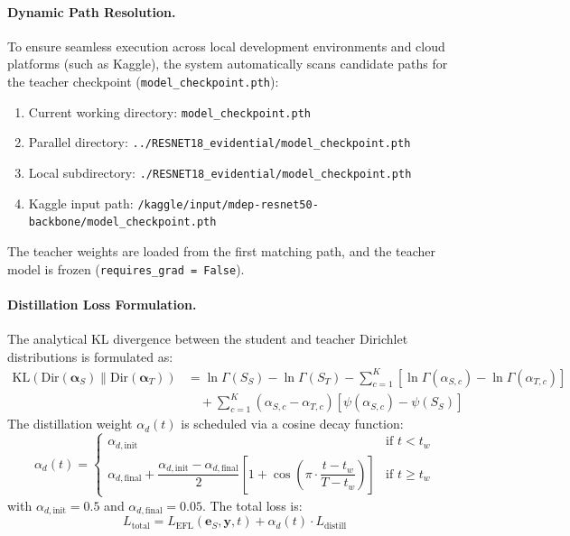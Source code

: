 \documentclass[letterpaper]{article} %
\newcommand{\Dir}{\text{Dir}}
\newcommand{\KL}{\text{KL}}
\begin{document}
\paragraph{Dynamic Path Resolution.}
To ensure seamless execution across local development environments and cloud platforms (such as Kaggle), the system automatically scans candidate paths for the teacher checkpoint (\texttt{model\_checkpoint.pth}):
\begin{enumerate}
    \item Current working directory: \texttt{model\_checkpoint.pth}
    \item Parallel directory: \texttt{../RESNET18_evidential/model\_checkpoint.pth}
    \item Local subdirectory: \texttt{./RESNET18_evidential/model\_checkpoint.pth}
    \item Kaggle input path: \texttt{/kaggle/input/mdep-resnet50-backbone/model\_checkpoint.pth}
\end{enumerate}
The teacher weights are loaded from the first matching path, and the teacher model is frozen (\texttt{requires\_grad = False}).

\paragraph{Distillation Loss Formulation.}
The analytical KL divergence between the student and teacher Dirichlet distributions is formulated as:
\begin{align}
    \KL(\Dir(\bm{\alpha}_S) \| \Dir(\bm{\alpha}_T)) &= \ln\Gamma(S_S) - \ln\Gamma(S_T) - \sum_{c=1}^K \left[\ln\Gamma(\alpha_{S,c}) - \ln\Gamma(\alpha_{T,c})\right] \nonumber \\
    &\quad + \sum_{c=1}^K (\alpha_{S,c} - \alpha_{T,c})\left[\psi(\alpha_{S,c}) - \psi(S_S)\right] \label{eq:dir_kl_full}
\end{align}
The distillation weight $\alpha_d(t)$ is scheduled via a cosine decay function:
\begin{equation}\label{eq:alpha_d}
    \alpha_d(t) = \begin{cases}
        \alpha_{d,\text{init}} & \text{if } t < t_w \\[6pt]
        \alpha_{d,\text{final}} + \dfrac{\alpha_{d,\text{init}} - \alpha_{d,\text{final}}}{2}\left[1 + \cos\!\left(\pi \cdot \dfrac{t - t_w}{T - t_w}\right)\right] & \text{if } t \ge t_w
    \end{cases}
\end{equation}
with $\alpha_{d,\text{init}} = 0.5$ and $\alpha_{d,\text{final}} = 0.05$. The total loss is:
\begin{equation}\label{eq:total_loss}
    L_{\text{total}} = L_{\text{EFL}}(\bm{e}_S, \bm{y}, t) + \alpha_d(t) \cdot L_{\text{distill}}
\end{equation}
\end{document}
